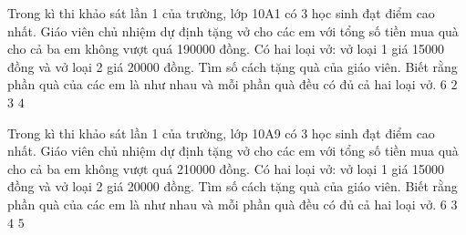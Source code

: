 \begin{ex}
 Trong kì thi khảo sát lần 1 của trường, lớp 10A1 có 3 học sinh đạt điểm cao nhất. Giáo viên chủ nhiệm dự định tặng vở cho các em với tổng số tiền mua quà cho cả ba em không vượt quá 190000 đồng. Có hai loại vở: vở loại 1 giá 15000 đồng và vở loại 2 giá 20000 đồng. Tìm số cách tặng quà của giáo viên. Biết rằng phần quà của các em là như nhau và mỗi phần quà đều có đủ cả hai loại vở.
\choice
{${6}$}
{${2}$}
{\True ${3}$}
{${4}$}
\end{ex}

\begin{ex}
 Trong kì thi khảo sát lần 1 của trường, lớp 10A9 có 3 học sinh đạt điểm cao nhất. Giáo viên chủ nhiệm dự định tặng vở cho các em với tổng số tiền mua quà cho cả ba em không vượt quá 210000 đồng. Có hai loại vở: vở loại 1 giá 15000 đồng và vở loại 2 giá 20000 đồng. Tìm số cách tặng quà của giáo viên. Biết rằng phần quà của các em là như nhau và mỗi phần quà đều có đủ cả hai loại vở.
\choice
{${6}$}
{${3}$}
{${4}$}
{\True ${5}$}
\end{ex}

